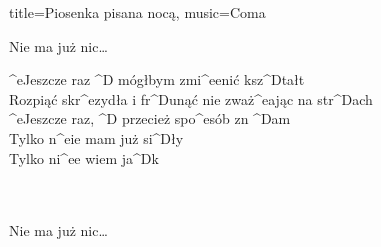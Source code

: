 \begin{song}{title={Piosenka pisana nocą}, music={Coma}}
\begin{chorus}
		Nie ma już nic\ldots
	\end{chorus}
	\begin{interlude}
		^{e}Jeszcze raz ^{D} mógłbym zmi^{e}enić ksz^{D}tałt \\
		Rozpiąć skr^{e}zydła i fr^{D}unąć nie zważ^{e}ając na str^{D}ach \\
		^{e}Jeszcze raz, ^{D} przecież spo^{e}sób zn ^{D}am \\
		Tylko n^{e}ie mam już si^{D}ły \\
		Tylko ni^{e}e wiem ja^{D}k \\ \\
		  \\
    	 
	\end{interlude}
	\begin{chorus}
		Nie ma już nic\ldots
	\end{chorus}
\end{song}

